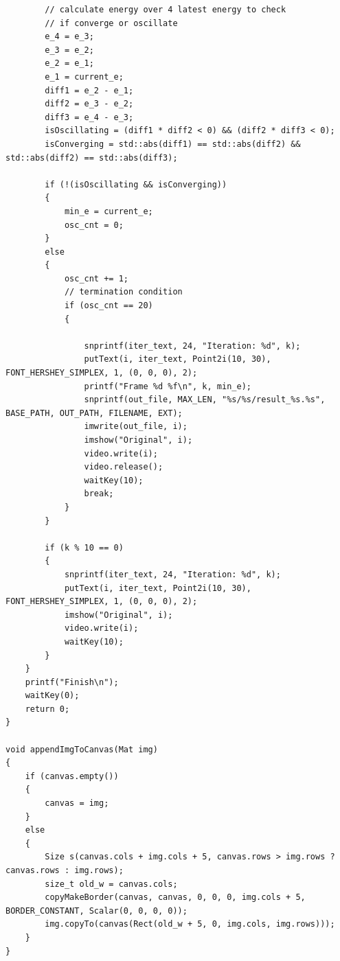 \documentclass[12pt,a4paper]{report}
\begin{document}
\begin{lstlisting}
        // calculate energy over 4 latest energy to check
        // if converge or oscillate
        e_4 = e_3;
        e_3 = e_2;
        e_2 = e_1;
        e_1 = current_e;
        diff1 = e_2 - e_1;
        diff2 = e_3 - e_2;
        diff3 = e_4 - e_3;
        isOscillating = (diff1 * diff2 < 0) && (diff2 * diff3 < 0);
        isConverging = std::abs(diff1) == std::abs(diff2) && std::abs(diff2) == std::abs(diff3);

        if (!(isOscillating && isConverging))
        {
            min_e = current_e;
            osc_cnt = 0;
        }
        else
        {
            osc_cnt += 1;
            // termination condition
            if (osc_cnt == 20)
            {

                snprintf(iter_text, 24, "Iteration: %d", k);
                putText(i, iter_text, Point2i(10, 30), FONT_HERSHEY_SIMPLEX, 1, (0, 0, 0), 2);
                printf("Frame %d %f\n", k, min_e);
                snprintf(out_file, MAX_LEN, "%s/%s/result_%s.%s", BASE_PATH, OUT_PATH, FILENAME, EXT);
                imwrite(out_file, i);
                imshow("Original", i);
                video.write(i);
                video.release();
                waitKey(10);
                break;
            }
        }

        if (k % 10 == 0)
        {
            snprintf(iter_text, 24, "Iteration: %d", k);
            putText(i, iter_text, Point2i(10, 30), FONT_HERSHEY_SIMPLEX, 1, (0, 0, 0), 2);
            imshow("Original", i);
            video.write(i);
            waitKey(10);
        }
    }
    printf("Finish\n");
    waitKey(0);
    return 0;
}

void appendImgToCanvas(Mat img)
{
    if (canvas.empty())
    {
        canvas = img;
    }
    else
    {
        Size s(canvas.cols + img.cols + 5, canvas.rows > img.rows ? canvas.rows : img.rows);
        size_t old_w = canvas.cols;
        copyMakeBorder(canvas, canvas, 0, 0, 0, img.cols + 5, BORDER_CONSTANT, Scalar(0, 0, 0, 0));
        img.copyTo(canvas(Rect(old_w + 5, 0, img.cols, img.rows)));
    }
}
\end{lstlisting}
\end{document}
